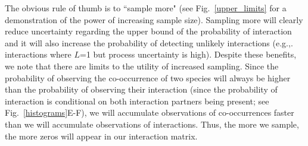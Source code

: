 \documentclass[12pt]{article}
\begin{document}
\begin{spacing}{2.0}





    The obvious rule of thumb is to ``sample more" (see Fig.~\ref{upper_limits} for a demonstration of the power of increasing sample size). Sampling more will clearly reduce uncertainty regarding the upper bound of the probability of interaction and it will also increase the probability of detecting unlikely interactions (e.g.,. interactions where $L$=1 but process uncertainty is high).
    Despite these benefits, we note that there are limits to the utility of increased sampling. Since the probability of observing the co-occurrence of two species will always be higher than the probability of observing their interaction (since the probability of interaction is conditional on both interaction partners being present; see Fig.~\ref{histograms}E-F), we will accumulate observations of co-occurrences faster than we will accumulate observations of interactions. Thus, the more we sample, the more zeros will appear in our interaction matrix.



\end{spacing}
\end{document}
